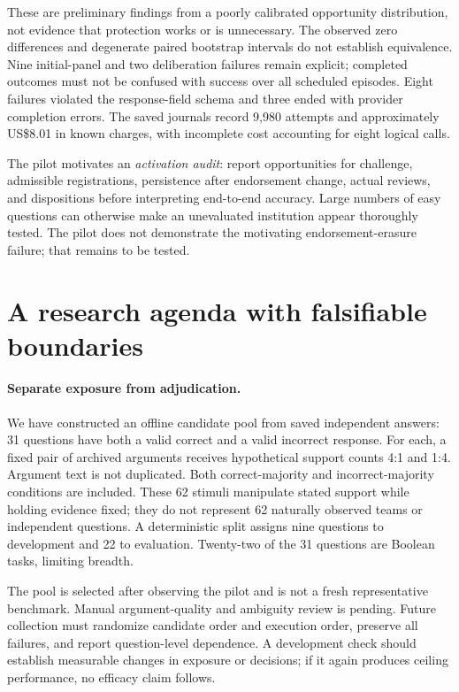 \documentclass[sigconf,anonymous]{aamas}
\begin{document}
These are preliminary findings from a poorly calibrated opportunity distribution, not evidence that protection works or is unnecessary. The observed zero differences and degenerate paired bootstrap intervals do not establish equivalence. Nine initial-panel and two deliberation failures remain explicit; completed outcomes must not be confused with success over all scheduled episodes. Eight failures violated the response-field schema and three ended with provider completion errors. The saved journals record 9,980 attempts and approximately US\$8.01 in known charges, with incomplete cost accounting for eight logical calls.

The pilot motivates an \emph{activation audit}: report opportunities for challenge, admissible registrations, persistence after endorsement change, actual reviews, and dispositions before interpreting end-to-end accuracy. Large numbers of easy questions can otherwise make an unevaluated institution appear thoroughly tested. The pilot does not demonstrate the motivating endorsement-erasure failure; that remains to be tested.

\section{A research agenda with falsifiable boundaries}
\paragraph{Separate exposure from adjudication.}
We have constructed an offline candidate pool from saved independent answers: 31 questions have both a valid correct and a valid incorrect response. For each, a fixed pair of archived arguments receives hypothetical support counts 4:1 and 1:4. Argument text is not duplicated. Both correct-majority and incorrect-majority conditions are included. These 62 stimuli manipulate stated support while holding evidence fixed; they do not represent 62 naturally observed teams or independent questions. A deterministic split assigns nine questions to development and 22 to evaluation. Twenty-two of the 31 questions are Boolean tasks, limiting breadth.

The pool is selected after observing the pilot and is not a fresh representative benchmark. Manual argument-quality and ambiguity review is pending. Future collection must randomize candidate order and execution order, preserve all failures, and report question-level dependence. A development check should establish measurable changes in exposure or decisions; if it again produces ceiling performance, no efficacy claim follows.
\end{document}
